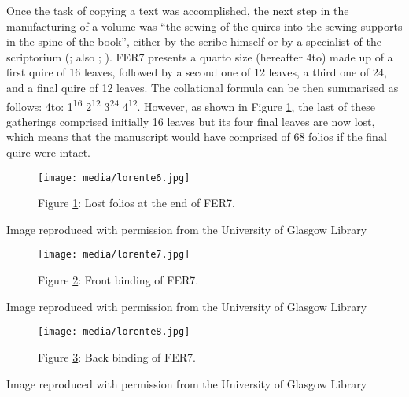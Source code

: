 \documentclass{article}
\begin{document}
Once the task of copying a text was accomplished, the next step in the
manufacturing of a volume was ``the sewing of the quires into the sewing
supports in the spine of the book'', either by the scribe himself or by
a specialist of the scriptorium (\cite[285]{romero-barranco_early_2017}; also \cite[6]{petti_english_1977}; \cite[49]{clemens_introduction_2007}). FER7 presents a quarto size
(hereafter 4to) made up of a first quire of 16 leaves, followed by a
second one of 12 leaves, a third one of 24, and a final quire of 12
leaves. The collational formula can be then summarised as follows: 4to:
1\textsuperscript{16} 2\textsuperscript{12} 3\textsuperscript{24}
4\textsuperscript{12}. However, as shown in Figure \ref{fig:lorente6}, the last of these
gatherings comprised initially 16 leaves but its four final leaves are
now lost, which means that the manuscript would have comprised of 68 folios
if the final quire were intact.

\begin{figure}[H]
    \centering
    \texttt{[image: media/lorente6.jpg]}
    \caption{Figure \ref{fig:lorente6}: Lost folios at the end of FER7.}
    \label{fig:lorente6}
\end{figure}


 Image reproduced with permission from the University of Glasgow Library 


 
\vfill

\begin{figure}[H]
  \centering
    \texttt{[image: media/lorente7.jpg]}
    \caption{Figure \ref{fig:lorente7}: Front binding of FER7.}
    \label{fig:lorente7}
  \end{figure}


 Image reproduced with permission from the University of Glasgow Library 


 
  \begin{figure}
    \texttt{[image: media/lorente8.jpg]}
    \caption{Figure \ref{fig:lorente8}: Back binding of FER7.}
    \label{fig:lorente8}
\end{figure}


 Image reproduced with permission from the University of Glasgow Library 


 
\end{document}
